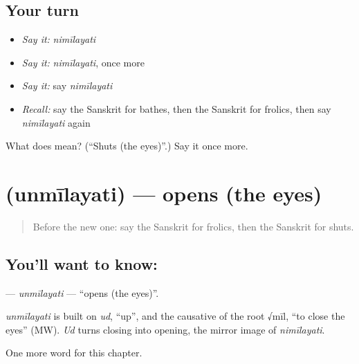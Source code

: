 \subsection*{Your turn}
\begin{itemize}
\raggedright
  \item \emph{Say it:} \emph{nimīlayati}
  \item \emph{Say it:} \emph{nimīlayati}, once more
  \item \emph{Say it:} say \emph{nimīlayati}
  \item \emph{Recall:} say the Sanskrit for bathes, then the Sanskrit for frolics, then say \emph{nimīlayati} again
\end{itemize}

\begin{tcolorbox}[breakable,colback=teal!4,colframe=teal!35!black,title={Before you move on}]
What does  mean? (\textquotedblleft{}Shuts (the eyes)\textquotedblright{}.) Say it once more.
\end{tcolorbox}
\section[\texorpdfstring{\sk{उन्मीलयति} (unmīlayati)}{उन्मीलयति (unmīlayati)}]{ (unmīlayati) — opens (the eyes)}

\label{lesson:SA-C206-unmilayati}



\begin{quote}
Before the new one: say the Sanskrit for frolics, then the Sanskrit for shuts.
\end{quote}

\subsection*{You'll want to know: }
\textbf{} — \emph{unmīlayati} — \textquotedblleft{}opens (the eyes)\textquotedblright{}.

\begin{cousinweb}
\emph{unmīlayati} is built on \emph{ud}, \textquotedblleft{}up\textquotedblright{}, and the causative of the root √mīl, \textquotedblleft{}to close the eyes\textquotedblright{} (MW). \emph{Ud} turns closing into opening, the mirror image of \emph{nimīlayati}.
\end{cousinweb}

\begin{grammarlens}[title={What you've built}]
One more word for this chapter.
\end{grammarlens}

